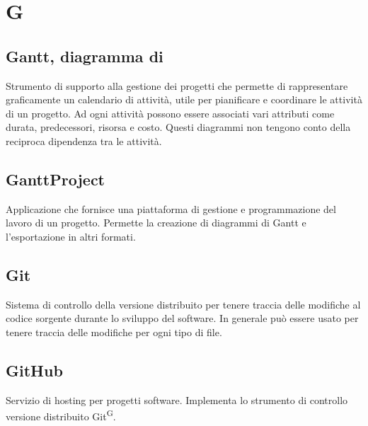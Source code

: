 \section{G}

\subsection{Gantt, diagramma di}
Strumento di supporto alla gestione dei progetti che permette di rappresentare graficamente un calendario di attività, utile per pianificare e coordinare le attività di un progetto. Ad ogni attività possono essere associati vari attributi come durata, predecessori, risorsa e costo. Questi diagrammi non tengono conto della reciproca dipendenza tra le attività.

\subsection{GanttProject}
Applicazione che fornisce una piattaforma di gestione e programmazione del lavoro di un progetto. Permette la creazione di diagrammi di Gantt\glo{} e l'esportazione in altri formati.

\subsection{Git}
Sistema di controllo della versione distribuito per tenere traccia delle modifiche al codice sorgente durante lo sviluppo del software. In generale può essere usato per tenere traccia delle modifiche per ogni tipo di file.

\subsection{GitHub}
Servizio di hosting per progetti software. Implementa lo strumento di controllo versione distribuito Git\textsuperscript{G}.




\clearpage